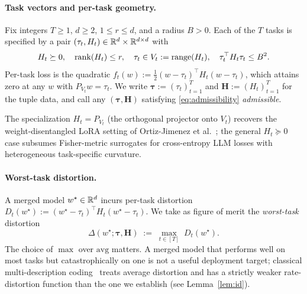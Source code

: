\paragraph{Task vectors and per-task geometry.} Fix integers
$T\geq 1$, $d\geq 2$, $1\leq r\leq d$, and a radius $B > 0$.
Each of the $T$ tasks is specified by a pair $(\tau_t, H_t)\in
\mathbb{R}^d\times\mathbb{R}^{d\times d}$ with
\begin{equation}\label{eq:admissibility}
  H_t \succeq 0,\quad \operatorname{rank}(H_t) \leq r,\quad \tau_t \in V_t :=
  \operatorname{range}(H_t),\quad \tau_t^\top H_t \tau_t \leq B^2.
\end{equation}
Per-task loss is the quadratic $f_t(w) := \tfrac12 (w - \tau_t)^\top
H_t (w - \tau_t)$, which attains zero at any $w$ with $P_{V_t} w
= \tau_t$. We write $\boldsymbol\tau := (\tau_t)_{t=1}^T$ and
$\boldsymbol H := (H_t)_{t=1}^T$ for the tuple data, and call any
$(\boldsymbol\tau, \boldsymbol H)$ satisfying
\eqref{eq:admissibility} \emph{admissible}.

The specialization $H_t = P_{V_t}$ (the orthogonal projector onto
$V_t$) recovers the weight-disentangled LoRA setting of
Ortiz-Jimenez et al.~\cite{ortizjimenez2023disentanglement}; the
general $H_t\succeq 0$ case subsumes Fisher-metric surrogates for
cross-entropy LLM losses with heterogeneous task-specific
curvature.

\paragraph{Worst-task distortion.} A merged model $w^\star\in
\mathbb{R}^d$ incurs per-task distortion $D_t(w^\star) := (w^\star-
\tau_t)^\top H_t (w^\star - \tau_t)$. We take as figure of merit
the \emph{worst-task} distortion
\begin{equation}\label{eq:Delta}
  \Delta(w^\star; \boldsymbol\tau, \boldsymbol H)
  \;:=\; \max_{t\in[T]}\; D_t(w^\star).
\end{equation}
The choice of $\max$ over $\mathrm{avg}$ matters. A merged model
that performs well on most tasks but catastrophically on one is
not a useful deployment target; classical multi-description
coding~\cite{elgamalcover1982md} treats average distortion and
has a strictly weaker rate-distortion function than the one we
establish (see Lemma~\ref{lem:id}).

